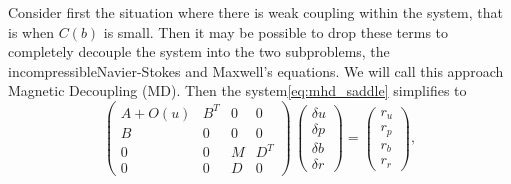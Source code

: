 Consider first the situation where there is  weak coupling within the system, that is when $C(b)$ is small. Then it may be possible to drop these terms to completely decouple the system into the two subproblems, the incompressibleNavier-Stokes and Maxwell's equations. We will call this approach Magnetic Decoupling (MD).
Then the system\eqref{eq:mhd_saddle} simplifies to
\begin{equation}
\label{eq:matrix_MD}
\left(
\begin{array}{cccc}
A+O(u) & B^T & 0 & 0\\
B & 0 & 0 & 0 \\
0 & 0 & M & D^T\\
0 & 0 & D & 0
\end{array}
\right)
\,
\left(
\begin{array}{c}
\delta u\\
\delta p\\
\delta b\\
\delta r
\end{array}
\right)  =
\begin{pmatrix}
r_u \\
r_p\\
r_b\\
r_r
\end{pmatrix},
\end{equation}
